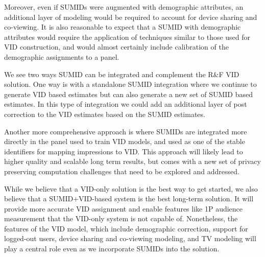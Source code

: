 \documentclass[]{article}
\begin{document}
Moreover, even if SUMIDs were augmented with demographic attributes, an additional layer of modeling would be required to account for device sharing and co-viewing. It is also reasonable to expect that a SUMID with demographic attributes would require the application of techniques similar to those used for VID construction, and would almost certainly include calibration of the demographic assignments to a panel.

We see two ways SUMID can be integrated and complement the R\&F VID solution. One way is with a standalone SUMID integration where we continue to generate VID based estimates but can also generate a new set of SUMID based estimates. In this type of integration we could add an additional layer of post correction to the VID estimates based on the SUMID estimates.

Another more comprehensive approach is where SUMIDs are integrated more directly in the panel used to train VID models, and used as one of the stable identifiers for mapping impressions to VID. This approach will likely lead to higher quality and scalable long term results, but comes with a new set of privacy preserving computation challenges that need to be explored and addressed.

While we believe that a VID-only solution is the best way to get started, we also believe that a SUMID+VID-based system is the best long-term solution. It will provide more accurate VID assignment and enable features like 1P audience measurement that the VID-only system is not capable of. Nonetheless, the features of the VID model, which include demographic correction, support for logged-out users, device
sharing and co-viewing modeling, and TV modeling will play a central role even as we incorporate SUMIDs into the solution.
\end{document}
